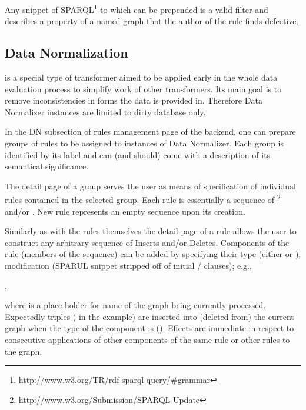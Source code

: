 Any snippet of SPARQL\footnote{\url{http://www.w3.org/TR/rdf-sparql-query/\#grammar}} to which  can be prepended is a valid filter and describes a property of a named graph that the author of the rule finds defective.

\subsection{Data Normalization}
\label{sub:dataNormalization}

 is a special type of {transformer} aimed to be applied early in the whole data evaluation process to simplify work of other {transformers}. Its main goal is to remove inconsistencies in forms the data is provided in. Therefore {Data Normalizer} instances are limited to dirty database only.

In the DN subsection of rules management page of the backend, one can prepare groups of rules to be assigned to instances of {Data Normalizer}. Each group is identified by its label and can (and should) come with a description of its semantical significance.

The detail page of a group serves the user as means of specification of individual rules contained in the selected group. Each rule is essentially a sequence of \footnote{\url{http://www.w3.org/Submission/SPARQL-Update}}  and/or . New rule represents an empty sequence upon its creation.

Similarly as with the rules themselves the detail page of a rule allows the user to construct any arbitrary sequence of {Inserts} and/or {Deletes}. Components of the rule (members of the sequence) can be added by specifying their type (either  or ), modification ({SPARUL} snippet stripped off of initial  /  clauses); e.g.,

\begin{center}
	,
\end{center}

where  is a place holder for name of the graph being currently processed. Expectedly triples ( in the example) are inserted into (deleted from) the current graph when the type of the component is  (). Effects are immediate in respect to consecutive applications of other components of the same rule or other rules to the graph.

